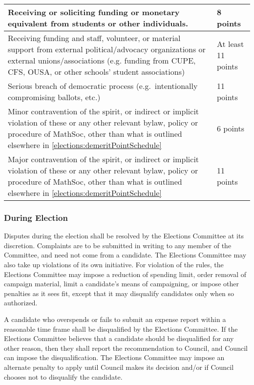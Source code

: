 \begin{center}
\begin{tabular}{| p{11.5cm} | p{4cm} |}
		\hline
		Receiving or soliciting funding or monetary equivalent from students or other individuals. & 8 points \\
		\hline 
		Receiving funding and staff, volunteer, or material support from external political/advocacy organizations or external unions/associations (e.g. funding from CUPE, CFS, OUSA, or other schools’ student associations) & At least 11 points \\
		\hline 
		Serious breach of democratic process (e.g.\ intentionally compromising ballots, etc.) & 11 points \\ 
		\hline
		Minor contravention of the spirit, or indirect or implicit violation of these or any other relevant bylaw, policy or procedure of MathSoc, other than what is outlined elsewhere in \cref{elections:demeritPointSchedule} & 6 points \\
		\hline
		Major contravention of the spirit, or indirect or implicit violation of these or any other relevant bylaw, policy or procedure of MathSoc, other than what is outlined elsewhere in \cref{elections:demeritPointSchedule} & 11 points \\
		\hline
	\end{tabular}
\end{center}

\subsubsection{During Election}
Disputes during the election shall be resolved by the Elections Committee at its discretion.
Complaints are to be submitted in writing to any member of the Committee, and need not come from a candidate.
The Elections Committee may also take up violations of its own initiative.
For violation of the rules, the Elections Committee may impose a reduction of spending limit, order removal of campaign material, limit a candidate's means of campaigning, or impose other penalties as it sees fit, except that it may disqualify candidates only when so authorized.

A candidate who overspends or fails to submit an expense report within a reasonable time frame shall be disqualified by the Elections Committee.
If the Elections Committee believes that a candidate should be disqualified for any other reason, then they shall report the recommendation to Council, and Council can impose the disqualification.
The Elections Committee may impose an alternate penalty to apply until Council makes its decision and/or if Council chooses not to disqualify the candidate.

